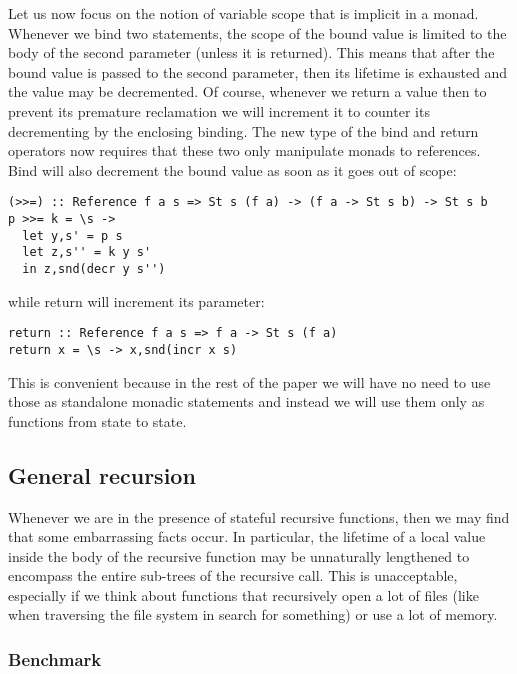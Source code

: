 
Let us now focus on the notion of variable scope that is implicit in a monad. Whenever we bind two statements, the scope of the bound value is limited to the body of the second parameter (unless it is returned). This means that after the bound value is passed to the second parameter, then its lifetime is exhausted and the value may be decremented. Of course, whenever we return a value then to prevent its premature reclamation we will increment it to counter its decrementing by the enclosing binding.
The new type of the bind and return operators now requires that these two only manipulate monads to references. Bind will also decrement the bound value as soon as it goes out of scope:

\begin{lstlisting}
(>>=) :: Reference f a s => St s (f a) -> (f a -> St s b) -> St s b
p >>= k = \s ->
  let y,s' = p s
  let z,s'' = k y s'
  in z,snd(decr y s'')
\end{lstlisting}

while return will increment its parameter:

\begin{lstlisting}
return :: Reference f a s => f a -> St s (f a)
return x = \s -> x,snd(incr x s)
\end{lstlisting}

This is convenient because in the rest of the paper we will have no need to use those as standalone monadic statements and instead we will use them only as functions from state to state.

\subsection{General recursion}

Whenever we are in the presence of stateful recursive functions, then we may find that some embarrassing facts occur. In particular, the lifetime of a local value inside the body of the recursive function may be unnaturally lengthened to encompass the entire sub-trees of the recursive call. This is unacceptable, especially if we think about functions that recursively open a lot of files (like when traversing the file system in search for something) or use a lot of memory.


\subsubsection{Benchmark}

